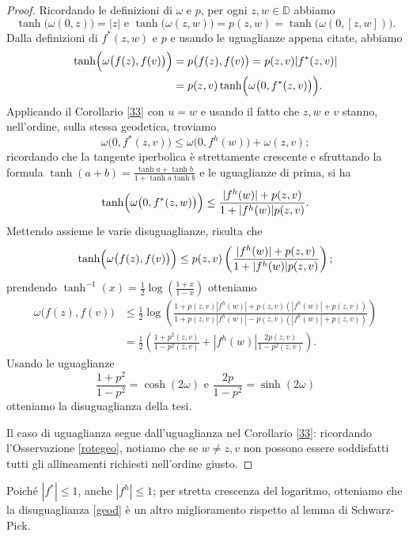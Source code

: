 \begin{proof}
  Ricordando le definizioni di $\omega$ e $p$, per ogni $z,w \in \mathbb{D}$ abbiamo
  $$\tanh\bigl(\omega(0,z)\bigr)=|z|\text{ e }\tanh\bigl(\omega(z,w)\bigr)=p(z,w)=\tanh\bigl(\omega(0,[z,w])\bigl).$$
  Dalla definizioni di $f^*(z,w)$ e $p$ e usando le uguaglianze appena citate, abbiamo
  \begin{align*}
    \tanh\Bigl(\omega\bigl(f(z),f(v)\bigr)\Bigr)&=p\bigl(f(z),f(v)\bigr)=p(z,v)|f^*(z,v)| \\
    &=p(z,v)\tanh\Bigl(\omega\bigl(0,f^*(z,v)\bigr)\Bigr).
  \end{align*}
  Applicando il Corollario \ref{33} con $u=w$ e usando il fatto che $z,w$ e $v$ stanno, nell'ordine, sulla stessa geodetica, troviamo
  $$\omega\bigl(0,f^*(z,v)\bigr) \le \omega\bigl(0,f^h(w)\bigr)+\omega(z,v);$$
  ricordando che la tangente iperbolica è strettamente crescente e sfruttando la formula $\tanh(a+b)=\frac{\tanh{a}+\tanh{b}}{1+\tanh{a}\tanh{b}}$ e le uguaglianze di prima, si ha
  $$\tanh\Bigl(\omega\bigl(0,f^*(z,w)\bigr)\Bigr) \le\frac{|f^h(w)|+p(z,v)}{1+|f^h(w)|p(z,v)}.$$
  Mettendo assieme le varie disuguaglianze, risulta che
  $$\tanh\Bigl(\omega\bigl(f(z),f(v)\bigr)\Bigr) \le p(z,v)\left(\frac{|f^h(w)|+p(z,v)}{1+|f^h(w)|p(z,v)}\right);$$
  prendendo $\tanh^{-1}(x)=\frac{1}{2}\log\left(\frac{1+x}{1-x}\right)$ otteniamo
  \begin{align*}
    \omega\bigl(f(z),f(v)\bigr) & \le \frac{1}{2}\log\left(\frac{1+p(z,v)|f^h(w)|+p(z,v)(|f^h(w)|+p(z,v))}{1+p(z,v)|f^h(w)|-p(z,v)(|f^h(w)|+p(z,v))}\right) \\
    & =\frac{1}{2}\left(\frac{1+p^2(z,v)}{1-p^2(z,v)}+|f^h(w)|\frac{2p(z,v)}{1-p^2(z,v)}\right).
  \end{align*}
  Usando le uguaglianze
  $$\frac{1+p^2}{1-p^2}=\cosh(2\omega) \text{ e } \frac{2p}{1-p^2}=\sinh(2\omega)$$
  otteniamo la disuguaglianza della tesi.

  Il caso di uguaglianza segue dall'uguaglianza nel Corollario \ref{33}: ricordando l'Osservazione \ref{rotegeo}, notiamo che se $w\not=z,v$ non possono essere soddisfatti tutti gli allineamenti richiesti nell'ordine giusto.
\end{proof}

\begin{oss}
  Poiché $|f^*| \le 1$, anche $|f^h| \le 1$; per stretta crescenza del logaritmo, otteniamo che la disuguaglianza \eqref{geod} è un altro miglioramento rispetto al lemma di Schwarz-Pick.
\end{oss}

